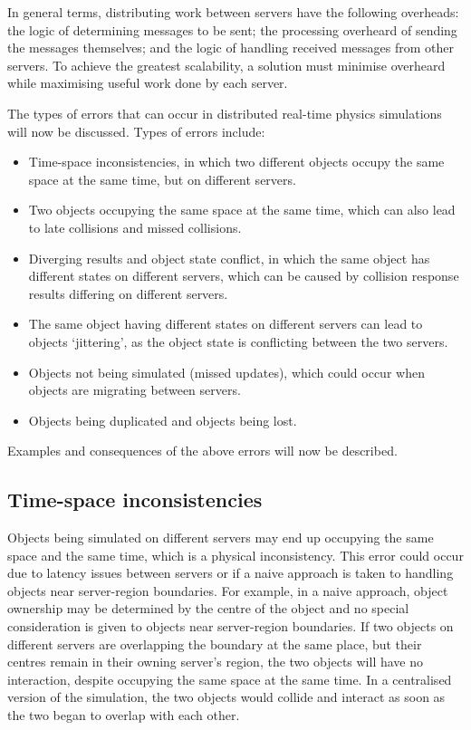 In general terms, distributing work between servers have the following overheads: the logic of determining messages to be sent; the processing overheard of sending the messages themselves; and the logic of handling received messages from other servers.
To achieve the greatest scalability, a solution must minimise overheard while maximising useful work done by each server.

The types of errors that can occur in distributed real-time physics simulations will now be discussed. 
Types of errors include:
\begin{itemize}
	\item Time-space inconsistencies, in which two different objects occupy the same space at the same time, but on different servers.
	\item Two objects occupying the same space at the same time, which can also lead to late collisions and missed collisions. 
	\item Diverging results and object state conflict, in which the same object has different states on different servers, which can be caused by collision response results differing on different servers.
	\item The same object having different states on different servers can lead to objects `jittering', as the object state is conflicting between the two servers. 
	\item Objects not being simulated (missed updates), which could occur when objects are migrating between servers. 
	\item Objects being duplicated and objects being lost. 
\end{itemize}

Examples and consequences of the above errors will now be described.

\subsection{Time-space inconsistencies}
Objects being simulated on different servers may end up occupying the same space and the same time, which is a physical inconsistency. This error could occur due to latency issues between servers or if a naive approach is taken to handling objects near server-region boundaries. For example, in a naive approach, object ownership may be determined by the centre of the object and no special consideration is given to objects near server-region boundaries. If two objects on different servers are overlapping the boundary at the same place, but their centres remain in their owning server's region, the two objects will have no interaction, despite occupying the same space at the same time. In a centralised version of the simulation, the two objects would collide and interact as soon as the two began to overlap with each other.

